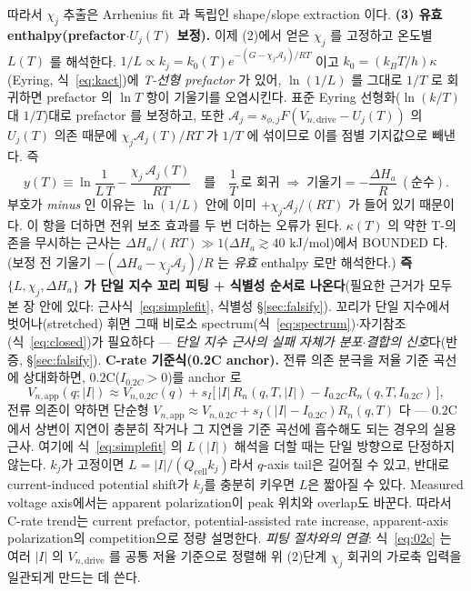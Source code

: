 \documentclass[11pt,a4paper]{article}
\newcommand{\app}{\mathrm{app}}
\newcommand{\drive}{\mathrm{drive}}
\newcommand{\cell}{\mathrm{cell}}
\begin{document}
따라서 $\chi_j$ 추출은 Arrhenius fit 과 독립인 shape/slope extraction 이다.
\textbf{(3) 유효 enthalpy(prefactor$\cdot U_j(T)$ 보정).} 이제 (2)에서 얻은 $\chi_j$ 를 고정하고 온도별 $L(T)$ 를 해석한다.
$1/L\propto k_j=k_0(T)e^{-(G-\chi_j\mathcal A_j)/RT}$ 이고 $k_0=(k_BT/h)\kappa$(Eyring, 식~\eqref{eq:kact})에
\emph{T-선형 prefactor} 가 있어, $\ln(1/L)$ 를 그대로 $1/T$ 로 회귀하면 prefactor 의 $\ln T$ 항이 기울기를 오염시킨다.
표준 Eyring 선형화($\ln(k/T)$ 대 $1/T$)대로 prefactor 를 보정하고, 또한 $\mathcal A_j=s_{\phi,j}F(V_{n,\drive}-U_j(T))$ 의
$U_j(T)$ 의존 때문에 $\chi_j\mathcal A_j(T)/RT$ 가 $1/T$ 에 섞이므로 이를 점별 기지값으로 빼낸다. 즉
\begin{equation*}
y(T)\equiv\ln\!\frac{1}{L\,T}-\frac{\chi_j\,\mathcal A_j(T)}{RT}\quad\text{를}\quad \frac1T\ \text{로 회귀} \;\Rightarrow\; \text{기울기}=-\frac{\Delta H_a}{R}\ (\text{순수}).
\end{equation*}
부호가 \emph{minus} 인 이유는 $\ln(1/L)$ 안에 이미 $+\chi_j\mathcal A_j/(RT)$ 가 들어 있기 때문이다. 이 항을 더하면 전위 보조 효과를 두 번 더하는 오류가 된다.
$\kappa(T)$ 의 약한 T-의존을 무시하는 근사는 $\Delta H_a/(RT)\gg1$($\Delta H_a\gtrsim40$ kJ/mol)에서 BOUNDED 다.
(보정 전 기울기 $-(\Delta H_a-\chi_j\mathcal A_j)/R$ 는 \emph{유효} enthalpy 로만 해석한다.)
\textbf{즉 $\{L,\chi_j,\Delta H_a\}$ 가 단일 지수 꼬리 피팅 + 식별성 순서로 나온다}(필요한 근거가 모두 본 장 안에 있다:
근사식~\eqref{eq:simplefit}, 식별성 \S\ref{sec:falsify}). 꼬리가 단일 지수에서 벗어나(stretched) 휘면 그때 비로소 spectrum(식~\eqref{eq:spectrum})$\cdot$자기참조(식~\eqref{eq:closed})가
필요하다 — \emph{단일 지수 근사의 실패 자체가 분포$\cdot$결합의 신호}다(반증, \S\ref{sec:falsify}).
\textbf{C-rate 기준식(0.2C anchor).} 전류 의존 분극을 저율 기준 곡선에 상대화하면, $0.2$C($I_{0.2C}>0$)를 anchor 로
\begin{equation}
V_{n,\app}(q;|I|)\approx V_{n,0.2C}(q)+s_I\big[\,|I|\,R_n(q,T,|I|)-I_{0.2C}R_n(q,T,I_{0.2C})\,\big],
\label{eq:02c}
\end{equation}
전류 의존이 약하면 단순형 $V_{n,\app}\approx V_{n,0.2C}+s_I(|I|-I_{0.2C})R_n(q,T)$ 다 — $0.2$C 에서 상변이 지연이
충분히 작거나 그 지연을 기준 곡선에 흡수해도 되는 경우의 실용 근사. 여기에 식~\eqref{eq:simplefit} 의 $L(|I|)$ 해석을 더할 때는 단일 방향으로 단정하지 않는다.
$k_j$가 고정이면 $L=|I|/(Q_\cell k_j)$라서 $q$-axis tail은 길어질 수 있고, 반대로 current-induced potential shift가 $k_j$를 충분히 키우면 $L$은 짧아질 수 있다.
Measured voltage axis에서는 apparent polarization이 peak 위치와 overlap도 바꾼다. 따라서 C-rate trend는 current prefactor, potential-assisted rate increase, apparent-axis polarization의 competition으로 정량 설명한다.
\emph{피팅 절차와의 연결}: 식~\eqref{eq:02c} 는 여러 $|I|$ 의 $V_{n,\drive}$ 를 공통 저율 기준으로
정렬해 위 (2)단계 $\chi_j$ 회귀의 가로축 입력을 일관되게 만드는 데 쓴다.
\end{document}
